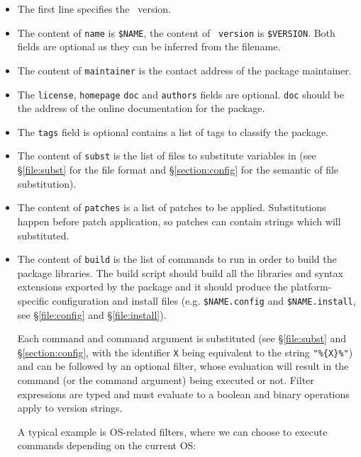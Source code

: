 \documentclass[a4paper,10pt]{article}
\begin{document}
\begin{itemize}

\item The first line specifies the \OPAM\ version.

\item The content of {\tt name} is \verb+$NAME+, the content of {\tt
  version} is \verb+$VERSION+. Both fields are optional as they can
  be inferred from the filename.

\item The content of {\tt maintainer} is the contact address of the
  package maintainer.

\item The {\tt license}, {\tt homepage} {\tt doc} and {\tt authors}
  fields are optional. {\tt doc} should be the address of the online
  documentation for the package.

\item The {\tt tags} field is optional contains a list of tags to
  classify the package.

\item The content of {\tt subst} is the list of files to substitute
  variables in (see \S\ref{file:subst} for the file format and
  \S\ref{section:config} for the semantic of file substitution).

\item The content of {\tt patches} is a list of patches to be applied.
  Substitutions happen before patch application, so patches can
  contain strings which will substituted.

\item The content of {\tt build} is the list of commands to run in
  order to build the package libraries. The build script should build
  all the libraries and syntax extensions exported by the package and
  it should produce the platform-specific configuration and install
  files (e.g. \verb+$NAME.config+ and \verb+$NAME.install+, see
  \S\ref{file:config} and \S\ref{file:install}).

   Each command and command argument is substituted (see
   \S\ref{file:subst} and \S\ref{section:config}, with the identifier
   {\tt X} being equivalent to the string {\tt "\%\{X\}\%"})
   and can be followed by an optional filter, whose evaluation will
   result in the command (or the command argument) being executed
   or not. Filter expressions are typed and must evaluate to a
   boolean and binary operations apply to version strings.

   A typical example is OS-related filters, where we can choose
   to execute commands depending on the current OS:


\end{itemize}
\end{document}
